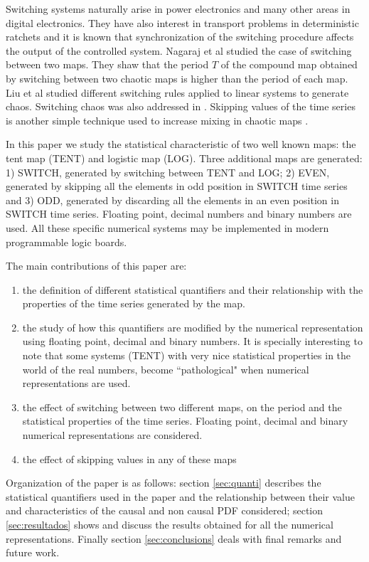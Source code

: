 Switching systems naturally arise in power electronics and many other areas in digital electronics. They have also interest in transport problems in deterministic ratchets \cite{Zarlenga2009} and it is known that synchronization of the switching procedure affects the output of the controlled system. Nagaraj et al \cite{Nagaraj2008} studied the case of switching between two maps. They shaw that the period $T$ of the
compound map obtained by switching between two chaotic maps is
higher than the period of each map.  Liu et al \cite{Liu2006} studied different switching rules applied to linear systems to generate chaos. Switching chaos was also addressed in \cite{Gluskin2008}.  Skipping values of the time series is another simple technique used to increase mixing in chaotic maps \cite{DeMicco2008}. 

In this paper we study the statistical characteristic of two well known maps: the tent map (TENT) and logistic map (LOG). Three additional maps are generated: 1) SWITCH, generated by switching between TENT and LOG; 2) EVEN, generated by skipping all the elements in odd position in SWITCH time series and 3) ODD, generated by discarding all the elements in an even position in SWITCH time series. Floating point, decimal numbers and binary numbers are used. All these specific numerical systems may be implemented in modern programmable logic boards. 

The main contributions of this paper are:
\begin{enumerate}
\item the definition of different statistical quantifiers and their relationship  with the properties of the time series generated by the map. 
\item the study of how this quantifiers are modified by the numerical representation using floating point, decimal and binary numbers. It is specially interesting to note that some systems (TENT) with very nice statistical properties in the world of the real numbers, become ``pathological" when numerical representations are used.
\item the effect of switching between two different maps, on the period and the statistical properties of the time series. Floating point, decimal and binary numerical representations are considered. 
\item the effect of skipping values in any of these maps
\end{enumerate}

Organization of the paper is as follows: section \ref{sec:quanti} describes the statistical quantifiers used in the paper and the relationship between their value and characteristics of the causal and non causal PDF considered; section \ref{sec:resultados} shows and discuss the results obtained for all the numerical representations. Finally section  \ref{sec:conclusions} deals with final remarks and future work. 